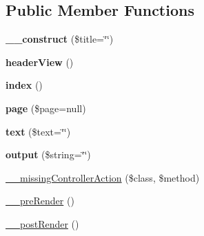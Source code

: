 \subsection*{Public Member Functions}
\begin{DoxyCompactItemize}
\item 
\hypertarget{class_generic_page_controller_ac68dc278d7c57fbcbb675550c5a17fb6}{
{\bfseries \_\-\_\-construct} (\$title=\char`\"{}\char`\"{})}
\label{class_generic_page_controller_ac68dc278d7c57fbcbb675550c5a17fb6}

\item 
\hypertarget{class_generic_page_controller_ac6d592a47df3f54da5bd899ff3ada3e9}{
{\bfseries headerView} ()}
\label{class_generic_page_controller_ac6d592a47df3f54da5bd899ff3ada3e9}

\item 
\hypertarget{class_generic_page_controller_a149eb92716c1084a935e04a8d95f7347}{
{\bfseries index} ()}
\label{class_generic_page_controller_a149eb92716c1084a935e04a8d95f7347}

\item 
\hypertarget{class_generic_page_controller_a164fce86afb5b2dfb3e62efc0461fd89}{
{\bfseries page} (\$page=null)}
\label{class_generic_page_controller_a164fce86afb5b2dfb3e62efc0461fd89}

\item 
\hypertarget{class_generic_page_controller_a14c153b70c64ec401186d28e6f4770bc}{
{\bfseries text} (\$text=\char`\"{}\char`\"{})}
\label{class_generic_page_controller_a14c153b70c64ec401186d28e6f4770bc}

\item 
\hypertarget{class_generic_page_controller_a14d87d76017cfc33727fbab85204f5a1}{
{\bfseries output} (\$string=\char`\"{}\char`\"{})}
\label{class_generic_page_controller_a14d87d76017cfc33727fbab85204f5a1}

\item 
\hyperlink{class_controller_a728c573e418d1f979340a4669524cacd}{\_\-\_\-missingControllerAction} (\$class, \$method)
\item 
\hyperlink{class_controller_ad86994d2463ea27cab892176e6509bdb}{\_\-\_\-preRender} ()
\item 
\hyperlink{class_controller_adc3c9cc4788f7ba7d1368fdc43568b1d}{\_\-\_\-postRender} ()
\end{DoxyCompactItemize}
